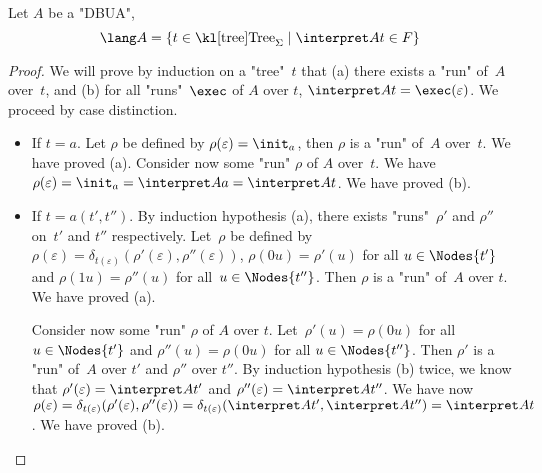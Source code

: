 \documentclass{article}
\begin{document}
\begin{lemma}
	Let $A$ be a "DBUA",
	\[ \lang A = \setdef {t \in \tree_{\Sigma}} {\interpret A t \in F} \]
\end{lemma}

\begin{proof}
	We will prove by induction on a "tree"~$t$ that (a) there exists a "run" of~$A$ over~$t$, and (b) for all "runs"~$\exec$ of $A$ over $t$, $\interpret A t = \exec (\varepsilon)$.
	We proceed by case distinction.
	\begin{itemize}
		\item If $t = a$. Let $\rho$ be defined by $\rho(\varepsilon)=\init_a$, then $\rho$ is a "run" of~$A$ over~$t$. We have proved (a).
		      Consider now some "run" $\rho$ of $A$ over~$t$. We have $\rho(\varepsilon)=\init_a=\interpret A a=\interpret A t$. We have proved  (b).

		\item If $t = a(t',t'')$. By induction hypothesis (a), there exists "runs"~$\rho'$ and $\rho''$ on~$t'$ and $t''$ respectively.
		      Let~$\rho$ be defined by $\rho(\varepsilon)=\delta_{t(\varepsilon)}(\rho'(\varepsilon),\rho''(\varepsilon))$,
		      $\rho(0u)=\rho'(u)$ for all $u\in\Nodes{t'}$ and $\rho(1u)=\rho''(u)$ for all~$u\in \Nodes{t''}$. Then $\rho$ is a "run" of~$A$ over $t$. We have proved (a).

		      Consider now some "run" $\rho$ of $A$ over $t$. Let~$\rho'(u)=\rho(0u)$ for all $u \in \Nodes {t'}$ and $\rho''(u)=\rho(0u)$ for all $u \in \Nodes {t''}$.
		      Then $\rho'$ is a "run" of~$A$ over $t'$ and $\rho''$ over $t''$. By induction hypothesis (b) twice, we know that $\rho'(\varepsilon)=\interpret A {t'}$ and $\rho''(\varepsilon)=\interpret A {t''}$.
		      We have now $\rho(\varepsilon) = \delta_{t(\varepsilon)}(\rho'(\varepsilon),\rho''(\varepsilon)) = \delta_{t(\varepsilon)}(\interpret A {t'},\interpret A {t''}) = \interpret A t$. We have proved (b).
	\end{itemize}
\end{proof}
\end{document}
